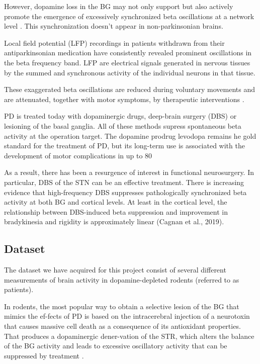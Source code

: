 \documentclass{article}
\begin{document}
However, dopamine loss in the BG may not only support but also actively promote the emergence of excessively synchronized beta oscillations at a network level \citep{Cagnan}. This synchronization doesn’t appear in non-parkinsonian brains.

Local field potential (LFP) recordings in patients withdrawn from their antiparkinsonian medication have consistently revealed prominent oscillations in the beta frequency band. LFP are electrical signals generated in nervous tissues by the summed and synchronous activity of the individual neurons in that tissue.

These exaggerated beta oscillations are reduced during voluntary movements and are attenuated, together with motor symptoms, by therapeutic interventions \citep{Cagnan}. 

PD is treated today with dopaminergic drugs, deep-brain surgery (DBS) or lesioning of the basal ganglia. All of these methods supress spontaneous beta activity at the operation target. The dopamine prodrug levodopa remains he gold standard for the treatment of PD, but its long-term use is associated with the development of motor complications in up to 80%

As a result, there has been a resurgence of interest in functional neurosurgery. In particular, DBS of the STN can be an effective treatment. There is increasing evidence that high-frequency DBS suppresses pathologically synchronized beta activity at both BG and cortical levels. At least in the cortical level, the relationship between DBS-induced beta suppression and improvement in bradykinesia and rigidity is approximately linear (Cagnan et al., 2019). 


\subsection{Dataset}
The dataset we have acquired for this project consist of several different measurements of brain activity in dopamine-depleted rodents (referred to as patients). 

In rodents, the most popular way to obtain a selective lesion of the BG that mimics the ef-fects of PD is based on the intracerebral injection of a neurotoxin that causes massive cell death as a consequence of its antioxidant properties. That produces a dopaminergic dener-vation of the STR, which alters the balance of the BG activity and leads to excessive oscillatory activity that can be suppressed by treatment \citep{Mallet}.
\end{document}
